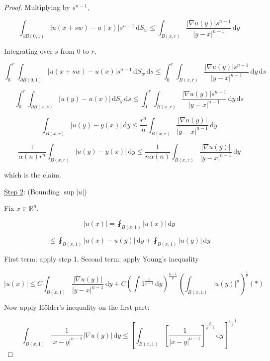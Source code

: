 \documentclass{article}
\theoremstyle{definition}
\begin{document}
\begin{proof}
Multiplying by \(s^{n-1}\),

\[
    \int_{\partial B(0,1)}^{} \vert u(x+sw) - u(x) \vert s^{n-1} \,\mathrm{d}S_w \leq \int_{B(x,r)}^{} \frac{\vert \nabla u(y) \vert s^{n-1}}{\vert y-x \vert ^{n-1}} \,\mathrm{d}y
\]

Integrating over \(s\) from \(0\) to \(r\),

\[
    \int_0^r \int_{\partial B(0,1)}^{} \vert u(x+sw) - u(x) \vert s^{n-1} \,\mathrm{d}S_w \, \mathrm{d} s \leq \int_0^r \int_{B(x,r)}^{} \frac{\vert \nabla u(y) \vert s^{n-1}}{\vert y-x \vert ^{n-1}} \,\mathrm{d}y \, \mathrm{d}s
\]

\[
    \int_0^r \int_{\partial B(x,s)}^{} \vert u(y) - u(x) \vert \,\mathrm{d}S_y \, \mathrm{d} s \leq \int_0^r \int_{B(x,r)}^{} \frac{\vert \nabla u(y) \vert s^{n-1}}{\vert y-x \vert ^{n-1}} \,\mathrm{d}y \, \mathrm{d}s
\]

\[
    \int_{B(x,r)}^{} \vert u(y) - y(x) \vert  \,\mathrm{d}y \leq \frac{r^n}{n} \int_{B(x,r)}^{} \frac{\vert \nabla u(y) \vert }{\vert y - x \vert ^{n-1}} \,\mathrm{d}y 
\]

\[
    \frac{1}{\alpha(n)r^n}\int_{B(x,r)}^{} \vert u(y) - y(x) \vert  \,\mathrm{d}y \leq \frac{1}{n \alpha(n)} \int_{B(x,r)}^{} \frac{\vert \nabla u(y) \vert }{\vert y - x \vert ^{n-1}} \,\mathrm{d}y 
\]

which is the claim.

\underline{Step 2}: (Bounding \(\sup \vert u \vert \))

Fix \(x\in\mathbb{R}^n\).

\[
    \vert u(x) \vert = \fint_{B(x,1)} \vert u(x) \vert \, \mathrm{d} y
\]

\[
    \leq \fint_{B(x,1)} \vert u(x) - u(y) \vert \, \mathrm{d}y + \fint_{B(x,1)} \vert u(y) \vert \, \mathrm{d}y
\]

First term: apply step 1. Second term: apply Young's inequality

\[
    \vert u(x) \vert  \leq C \int_{B(x,1)}^{} \frac{\vert \nabla u(y) \vert }{\vert y-x \vert ^{n-1}} \,\mathrm{d}y + C \left( \int 1^{\frac{p}{p-1}} \, \mathrm{d}y\right)^{\frac{p-1}{p}} \left( \int_{B(x,1)} \vert u(y) \vert ^ p \right) ^\frac{1}{p} (\ast)
\]

Now apply H\"older's inequality on the first part:

\[
    \int_{B(x,1)}^{} \frac{1}{\vert x - y \vert ^{n-1}} \vert \nabla u (y) \vert  \,\mathrm{d}y \leq \left[ \int_{B(x,1)}^{} \left[ \frac{1}{\vert x - y \vert ^{n-1}} \right] ^{\frac{p}{p-1}} \,\mathrm{d}y  \right] ^{\frac{p-1}{p}} 
\]


\end{proof}
\end{document}
